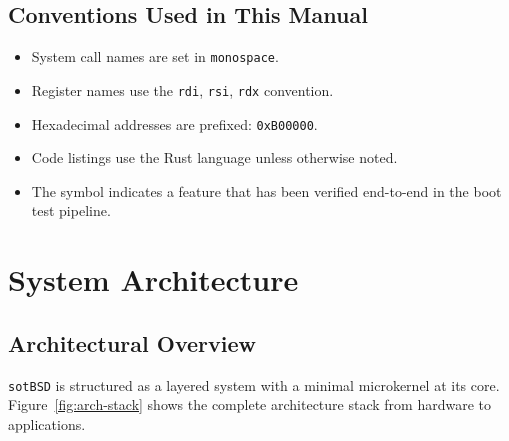 \documentclass[11pt,a4paper,twoside]{report}
\theoremstyle{definition}
\newcommand{\sotBSD}{\texttt{sotBSD}}
\newcommand{\syscall}[1]{\texttt{#1}}
\newcommand{\reg}[1]{\texttt{#1}}
\newcommand{\hex}[1]{\texttt{0x#1}}
\newcommand{\cmark}{\color{tngreen}\checkmark}
\begin{document}
\section{Conventions Used in This Manual}

\begin{itemize}[leftmargin=1.4em]
  \item System call names are set in \syscall{monospace}.
  \item Register names use the \reg{rdi}, \reg{rsi}, \reg{rdx} convention.
  \item Hexadecimal addresses are prefixed: \hex{B00000}.
  \item Code listings use the Rust language unless otherwise noted.
  \item The symbol \cmark{} indicates a feature that has been verified
        end-to-end in the boot test pipeline.
\end{itemize}


\chapter{System Architecture}
\label{ch:arch}

\section{Architectural Overview}

\sotBSD{} is structured as a layered system with a minimal microkernel at its
core. Figure~\ref{fig:arch-stack} shows the complete architecture stack from
hardware to applications.
\end{document}
